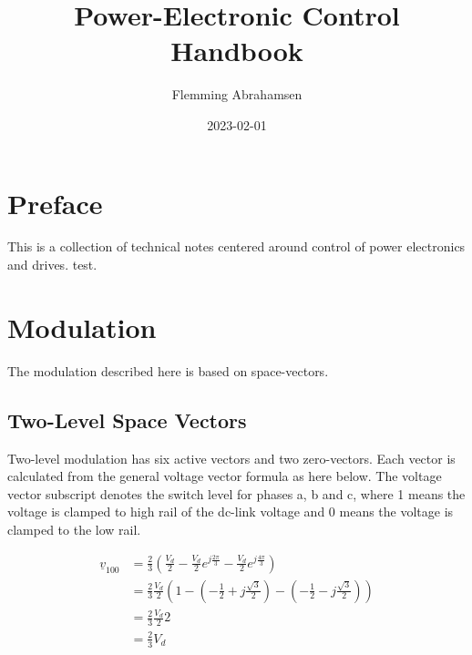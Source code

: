 \documentclass[]{book}
\title{Power-Electronic Control Handbook}
\author{Flemming Abrahamsen}
\date{2023-02-01}
\begin{document}
\maketitle

{
\setcounter{tocdepth}{1}
\tableofcontents
}
\hypertarget{preface}{%
\chapter{Preface}\label{preface}}

This is a collection of technical notes centered around control of power electronics and drives.
test.

\hypertarget{modulation}{%
\chapter{Modulation}\label{modulation}}

The modulation described here is based on space-vectors.

\hypertarget{two-level-space-vectors}{%
\section{Two-Level Space Vectors}\label{two-level-space-vectors}}

Two-level modulation has six active vectors and two zero-vectors. Each vector is calculated from the general voltage vector formula as here below. The voltage vector subscript denotes the switch level for phases a, b and c, where 1 means the voltage is clamped to high rail of the dc-link voltage and 0 means the voltage is clamped to the low rail.

\[
\begin{aligned}
\underline{v}_{100} 
& = \frac{2}{3} \left( \frac{V_d}{2} - \frac{V_d}{2} e^{j \frac{2 \pi}{3}}- \frac{V_d}{2} e^{j \frac{4 \pi}{3}} \right)\\
& = \frac{2}{3} \frac{V_d}{2} \left( 1-  (- \frac{1}{2}+j\frac{\sqrt{3}}{2}) - (- \frac{1}{2}-j\frac{\sqrt{3}}{2}) \right)\\
& = \frac{2}{3} \frac{V_d}{2} 2\\
& = \frac{2}{3} V_d\\
\end{aligned}
\]
\end{document}
